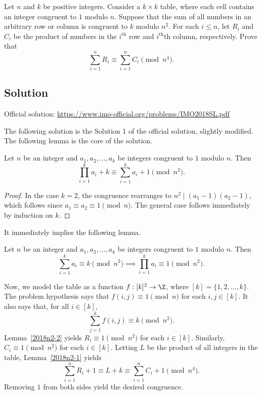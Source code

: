 Let $n$ and $k$ be positive integers.
Consider a $k \times k$ table, where each cell contains an integer congruent to $1$ modulo $n$.
Suppose that the sum of all numbers in an arbitrary row or column is congruent to $k$ modulo $n^2$.
For each $i \leq n$, let $R_i$ and $C_i$ be the product of numbers in the $i^{\text{th}}$ row and $i^{\text{th}}$th column, respectively.
Prove that
\[ \sum_{i = 1}^n R_i \equiv \sum_{i = 1}^n C_i \pmod{n^4}. \]



\subsection*{Solution}

Official solution: \url{https://www.imo-official.org/problems/IMO2018SL.pdf}

The following solution is the Solution 1 of the official solution, slightly modified.
The following lemma is the core of the solution.

\begin{lemma}\label{2018n2-1}
Let $n$ be an integer and $a_1, a_2, \ldots, a_k$ be integers congruent to $1$ modulo $n$.
Then \[ \prod_{i = 1}^k a_i + k \equiv \sum_{i = 1}^k a_i + 1 \pmod{n^2}. \]
\end{lemma}
\begin{proof}
In the case $k = 2$, the congruence rearranges to $n^2 \mid (a_1 - 1)(a_2 - 1)$, which follows since $a_1 \equiv a_2 \equiv 1 \pmod{n}$.
The general case follows immediately by induction on $k$.
\end{proof}

It immediately implies the following lemma.

\begin{lemma}\label{2018n2-2}
Let $n$ be an integer and $a_1, a_2, \ldots, a_k$ be integers congruent to $1$ modulo $n$.
Then \[ \sum_{i = 1}^k a_i \equiv k \pmod{n^2} \implies \prod_{i = 1}^k a_i \equiv 1 \pmod{n^2}. \]
\end{lemma}

Now, we model the table as a function $f : [k]^2 \to \Z$, where $[k] = \{1, 2, \ldots, k\}$.
The problem hypothesis says that $f(i, j) \equiv 1 \pmod{n}$ for each $i, j \in [k]$.
It also says that, for all $i \in [k]$,
\[ \sum_{j = 1}^k f(i, j) \equiv k \pmod{n^2}. \]
Lemma~\ref{2018n2-2} yields $R_i \equiv 1 \pmod{n^2}$ for each $i \in [k]$.
Similarly, $C_i \equiv 1 \pmod{n^2}$ for each $i \in [k]$.
Letting $L$ be the product of all integers in the table, Lemma~\ref{2018n2-1} yields
\[ \sum_{i = 1}^n R_i + 1 \equiv L + k \equiv \sum_{i = 1}^n C_i + 1 \pmod{n^4}. \]
Removing $1$ from both sides yield the desired congruence.
